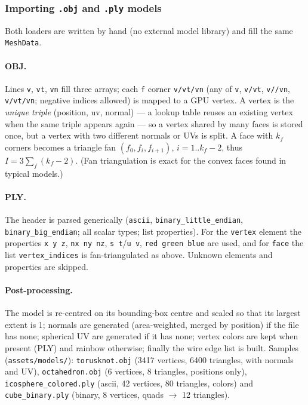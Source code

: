 \documentclass[a4paper, 11pt]{article}
\newcommand{\code}[1]{\texttt{#1}}
\begin{document}
\subsubsection{Importing \texttt{.obj} and \texttt{.ply} models}\label{sec:models}

Both loaders are written by hand (no external model library) and fill the same \code{MeshData}.

\paragraph{OBJ.} Lines \code{v}, \code{vt}, \code{vn} fill three arrays; each \code{f} corner \code{v/vt/vn} (any of \code{v}, \code{v/vt}, \code{v//vn}, \code{v/vt/vn};
negative indices allowed) is mapped to a GPU vertex. A vertex is the \emph{unique triple} (position, uv, normal) --- a lookup table
reuses an existing vertex when the same triple appears again --- so a vertex shared by many faces is stored once, but a vertex with two
different normals or UVs is split. A face with $k_f$ corners becomes a triangle fan $(f_0,f_i,f_{i+1})$, $i=1..k_f-2$, thus
$I=3\sum_f(k_f-2)$. (Fan triangulation is exact for the convex faces found in typical models.)

\paragraph{PLY.} The header is parsed generically (\code{ascii}, \code{binary\_little\_endian}, \code{binary\_big\_endian}; all scalar types; list properties).
For the \code{vertex} element the properties \code{x y z}, \code{nx ny nz}, \code{s t}/\code{u v}, \code{red green blue} are used, and for \code{face} the
list \code{vertex\_indices} is fan-triangulated as above. Unknown elements and properties are skipped.

\paragraph{Post-processing.} The model is re-centred on its bounding-box centre and scaled so that its largest extent is 1;
normals are generated (area-weighted, merged by position) if the file has none; spherical UV are generated if it has none; vertex colors are
kept when present (PLY) and rainbow otherwise; finally the wire edge list is built. Samples (\code{assets/models/}): \code{torusknot.obj}
(3417 vertices, 6400 triangles, with normals and UV), \code{octahedron.obj} (6 vertices, 8 triangles, positions only),
\code{icosphere\_colored.ply} (ascii, 42 vertices, 80 triangles, colors) and \code{cube\_binary.ply} (binary, 8 vertices, quads $\to$ 12 triangles).
\end{document}
